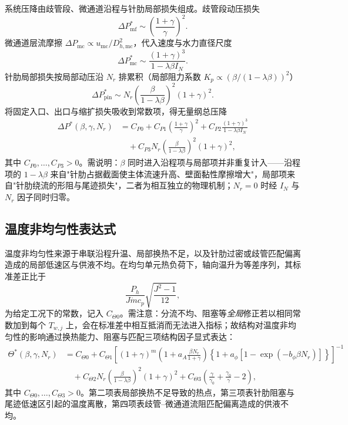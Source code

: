 \documentclass[12pt,a4paper]{ctexart}
\begin{document}
系统压降由歧管段、微通道沿程与针肋局部损失组成。歧管段动压损失
\begin{equation}
    \Delta P_{\mathrm{mf}}^*\sim\left(\frac{1+\gamma}{\gamma}\right)^2 .
\end{equation}
微通道层流摩擦 $\Delta P_{\mathrm{mc}}\propto u_{\mathrm{mc}}/D_{h,\mathrm{mc}}^2$，代入速度与水力直径尺度
\begin{equation}
    \Delta P_{\mathrm{mc}}^*\sim\frac{(1+\gamma)^3}{1-\lambda\beta I_N}.
\end{equation}
针肋局部损失按局部动压沿 $N_r$ 排累积（局部阻力系数 $K_p\propto(\beta/(1-\lambda\beta))^2$）
\begin{equation}
    \Delta P_{\mathrm{pin}}^*\sim N_r\left(\frac{\beta}{1-\lambda\beta}\right)^2(1+\gamma)^2 .
\end{equation}
将固定入口、出口与缩扩损失吸收到常数项，得无量纲总压降
\begin{equation}
\begin{aligned}
    \Delta P^*(\beta,\gamma,N_r)
    &=C_{P0}+C_{P1}\left(\frac{1+\gamma}{\gamma}\right)^2
    +C_{P2}\frac{(1+\gamma)^3}{1-\lambda\beta I_N}\\
    &\quad+C_{P3}N_r\left(\frac{\beta}{1-\lambda\beta}\right)^2(1+\gamma)^2 ,
\end{aligned}
\label{eq:Pstar-final}
\end{equation}
其中 $C_{P0},\ldots,C_{P3}>0$。需说明：$\beta$ 同时进入沿程项与局部项并非重复计入——沿程项的 $1-\lambda\beta$ 来自"针肋占据截面使主体流速升高、壁面黏性摩擦增大"，局部项来自"针肋绕流的形阻与尾迹损失"，二者为相互独立的物理机制；$N_r=0$ 时经 $I_N$ 与 $N_r$ 因子同时归零。

\subsection{温度非均匀性表达式}

温度非均匀性来源于串联沿程升温、局部换热不足，以及针肋过密或歧管匹配偏离造成的局部低速区与供液不均。在均匀单元热负荷下，轴向温升为等差序列，其标准差正比于
\begin{equation}
    \frac{P_h}{J\dot m c_p}\sqrt{\frac{J^2-1}{12}},
\end{equation}
为给定工况下的常数，记入 $C_{\Theta0}$。需注意：分流不均、阻塞等\emph{全局}修正若以相同常数加到每个 $T_{w,j}$ 上，会在标准差中相互抵消而无法进入指标；故结构对温度非均匀性的影响通过换热能力、阻塞与匹配三项结构因子显式表达：
\begin{equation}
\begin{aligned}
    \Theta^*(\beta,\gamma,N_r)
    &=C_{\Theta0}
    +C_{\Theta1}\left[(1+\gamma)^m
    \left(1+a_A\frac{\beta N_r}{1+\gamma}\right)
    \left\{1+a_\phi\left[1-\exp(-b_\phi\beta N_r)\right]\right\}\right]^{-1}\\
    &\quad
    +C_{\Theta2}N_r\left(\frac{\beta}{1-\lambda\beta}\right)^2(1+\gamma)^2
    +C_{\Theta3}\left(\frac{\gamma}{\gamma_0}+\frac{\gamma_0}{\gamma}-2\right),
\end{aligned}
\label{eq:Thetastar-final}
\end{equation}
其中 $C_{\Theta0},\ldots,C_{\Theta3}>0$。第二项表局部换热不足导致的热点，第三项表针肋阻塞与尾迹低速区引起的温度离散，第四项表歧管--微通道流阻匹配偏离造成的供液不均。
\end{document}
